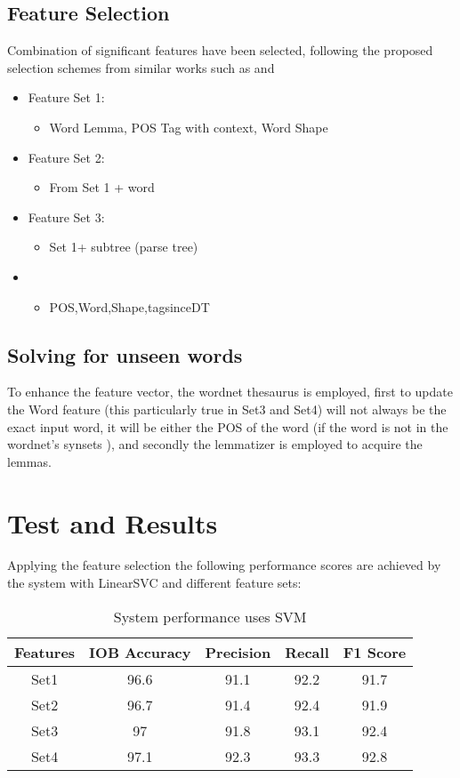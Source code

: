 \documentclass[11pt]{article}
\begin{document}
\subsection{Feature Selection}
Combination of significant features have been selected, following the proposed selection schemes from similar works such as \cite{LREC:08} and \cite{LREC:08}

\begin{itemize}
	\item Feature Set 1:
	\begin{itemize}
		\item Word Lemma, POS Tag with context, Word Shape 
	\end{itemize}
	\item Feature Set 2:
	\begin{itemize}
		\item From Set 1 + word
	\end{itemize}
	\item Feature Set 3:
	\begin{itemize}
		\item  Set 1+ subtree (parse tree)
	\end{itemize} 
	\item
	\begin{itemize}
		\item POS,Word,Shape,tagsinceDT
	\end{itemize} 
\end{itemize}

\subsection{Solving for unseen words}
To enhance the feature vector, the wordnet thesaurus is employed, first to update the Word feature (this particularly true in Set3 and Set4) will not always be the exact input word, it will be either the POS of the word (if the word is not in the wordnet's synsets ), and secondly the lemmatizer is employed to acquire the lemmas.              

\section {Test and Results}
Applying the feature selection the following performance scores are achieved by the system with LinearSVC and different feature sets:
\begin{table}
\begin{tabular}{|c|c|c|c|c|}
	\hline 
	Features& IOB Accuracy  & Precision  & Recall  & F1 Score  \\ 
	\hline 
	Set1	&96.6&	91.1&	92.2&	91.7\\
	\hline 
	Set2	&96.7	&91.4	&92.4	&91.9\\
	\hline 
	Set3&	97&	91.8&	93.1&	92.4\\
	\hline 
	Set4	& 97.1&92.3&93.3&92.8	\\
	\hline 

\end{tabular} 
\caption {System performance uses SVM}
\end{table}
\end{document}
